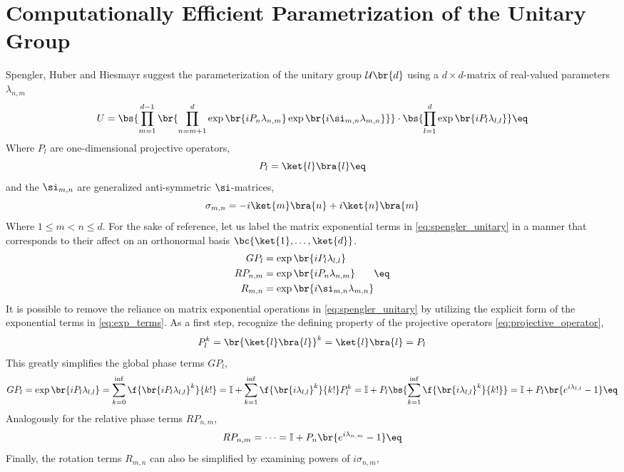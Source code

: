 \documentclass[aps, 10pt, english, twoside, pra, nofootinbib, longbibliography]{revtex4-1}
\theoremstyle{plain}
\theoremstyle{definition}
\theoremstyle{remark}
\begin{document}
    \section{Computationally Efficient Parametrization of the Unitary Group}
    Spengler, Huber and Hiesmayr \cite{Spengler_2010_Unitary} suggest the parameterization of the unitary group $\mathcal{U}\br{d}$ using a $d\times d$-matrix of real-valued parameters $\lambda_{n, m}$
    \[ U = \bs{\prod_{m=1}^{d-1} \br{\prod_{n=m+1}^{d} \exp\br{i P_n \lambda_{n,m}}\exp\br{i \si_{m,n} \lambda_{m,n}}}} \cdot \bs{\prod_{l=1}^{d} \exp\br{iP_l \lambda_{l,l}}}  \eq \label{eq:spengler_unitary} \]
    Where $P_l$ are one-dimensional projective operators,
    \[ P_l = \ket{l}\bra{l} \eq \label{eq:projective_operator} \]
    and the $\si_{m,n}$ are generalized anti-symmetric $\si$-matrices,
    \[ \sigma_{m,n} = -i \ket{m}\bra{n} +i \ket{n}\bra{m} \]
    Where $1 \leq m < n \leq d$.
    For the sake of reference, let us label the matrix exponential terms in \cref{eq:spengler_unitary} in a manner that corresponds to their affect on an orthonormal basis $\bc{\ket{1}, \ldots, \ket{d}}$.
    \begin{align}
    \begin{split}
        GP_l &= \exp\br{iP_l \lambda_{l,l}} \\
        RP_{n,m} &= \exp\br{i P_n \lambda_{n,m}} \\
        R_{m,n} &= \exp\br{i \si_{m,n} \lambda_{m,n}}
    \end{split} \eq \label{eq:exp_terms}
    \end{align}
    It is possible to remove the reliance on matrix exponential operations in \cref{eq:spengler_unitary} by utilizing the explicit form of the exponential terms in \cref{eq:exp_terms}. As a first step, recognize the defining property of the projective operators \cref{eq:projective_operator},
    \[ P_l^k = \br{\ket{l}\bra{l}}^k = \ket{l}\bra{l} = P_l \]
    This greatly simplifies the global phase terms $GP_l$,
    \[ GP_l = \exp\br{iP_l \lambda_{l,l}} = \sum_{k=0}^{\inf} \f{\br{iP_l \lambda_{l,l}}^k}{k!} = \mathbb{I} + \sum_{k=1}^{\inf} \f{\br{i \lambda_{l,l}}^k}{k!}P_l^k = \mathbb{I} + P_l \bs{\sum_{k=1}^{\inf} \f{\br{i \lambda_{l,l}}^k}{k!}} = \mathbb{I} + P_l \br{e^{i \lambda_{l,l}} - 1} \eq \label{eq:unitary_GP} \]
    Analogously for the relative phase terms $RP_{n,m}$,
    \[ RP_{n,m} = \cdots = \mathbb{I} + P_n \br{e^{i \lambda_{n,m}} - 1} \eq \label{eq:unitary_RP} \]
    Finally, the rotation terms $R_{m,n}$ can also be simplified by examining powers of $i \sigma_{n,m}$,
\end{document}

